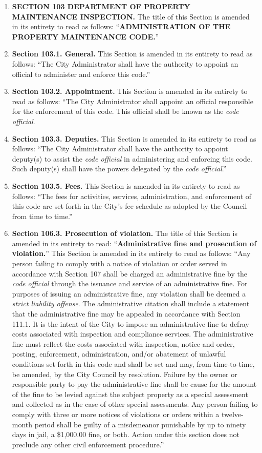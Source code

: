 \begin{enumerate}[{\indent}1)]
    \item \textbf{SECTION 103 DEPARTMENT OF PROPERTY MAINTENANCE INSPECTION.} The title of this Section is amended in its entirety to read as follows: “\textbf{ADMINISTRATION OF THE PROPERTY MAINTENANCE CODE.}”
    \item \textbf{Section 103.1. General.} This Section is amended in its entirety to read as follows: “The City Administrator shall have the authority to appoint an official to administer and enforce this code.”
    \item \textbf{Section 103.2. Appointment.} This Section is amended in its entirety to read as follows: “The City Administrator shall appoint an official responsible for the enforcement of this code.  This official shall be known as the \textit{code official}.
    \item \textbf{Section 103.3. Deputies.} This Section is amended in its entirety to read as follows: “The City Administrator shall have the authority to appoint deputy(s) to assist the \textit{code official} in administering and enforcing this code.  Such deputy(s) shall have the powers delegated by the \textit{code official}.”
    \item \textbf{Section 103.5. Fees.} This Section is amended in its entirety to read as follows: “The fees for activities, services, administration, and enforcement of this code are set forth in the City’s fee schedule as adopted by the Council from time to time.”
    \item \textbf{Section 106.3. Prosecution of violation.} The title of this Section is amended in its entirety to read: “\textbf{Administrative fine and prosecution of violation.}”  This Section is amended in its entirety to read as follows: “Any person failing to comply with a notice of violation or order served in accordance with Section 107 shall be charged an administrative fine by the \textit{code official} through the issuance and service of an administrative fine.  For purposes of issuing an administrative fine, any violation shall be deemed a \textit{strict liability offense}.  The administrative citation shall include a statement that the administrative fine may be appealed in accordance with Section 111.1. It is the intent of the City to impose an administrative fine to defray costs associated with inspection and compliance services.  The administrative fine must reflect the costs associated with inspection, notice and order, posting, enforcement, administration, and/or abatement of unlawful conditions set forth in this code and shall be set and may, from time-to-time, be amended, by the City Council by resolution.  Failure by the owner or responsible party to pay the administrative fine shall be cause for the amount of the fine to be levied against the subject property as a special assessment and collected as in the case of other special assessments.  Any person failing to comply with three or more notices of violations or orders within a twelve-month period shall be guilty of a misdemeanor punishable by up to ninety days in jail, a \$1,000.00 fine, or both.  Action under this section does not preclude any other civil enforcement procedure.”

\end{enumerate}
